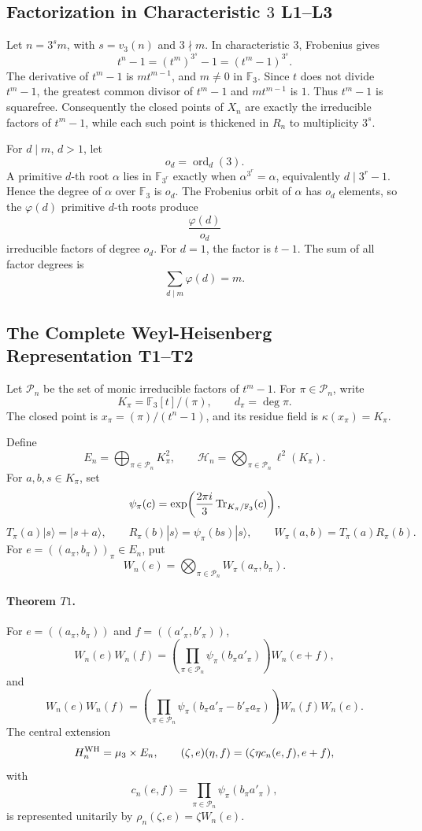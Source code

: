 \subsection{Factorization in Characteristic \texorpdfstring{\(3\)}{3} L1--L3}

Let \(n=3^s m\), with \(s=v_3(n)\) and \(3\nmid m\).  In characteristic
\(3\), Frobenius gives
\[
  t^n-1=(t^m)^{3^s}-1=(t^m-1)^{3^s}.
\]
The derivative of \(t^m-1\) is \(m t^{m-1}\), and \(m\ne0\) in
\(\mathbb F_3\).  Since \(t\) does not divide \(t^m-1\), the greatest common
divisor of \(t^m-1\) and \(m t^{m-1}\) is \(1\).  Thus \(t^m-1\) is
squarefree.  Consequently the closed points of \(X_n\) are exactly the
irreducible factors of \(t^m-1\), while each such point is thickened in
\(R_n\) to multiplicity \(3^s\).

For \(d\mid m\), \(d>1\), let
\[
  o_d=\operatorname{ord}_d(3).
\]
A primitive \(d\)-th root \(\alpha\) lies in \(\mathbb F_{3^r}\) exactly when
\(\alpha^{3^r}=\alpha\), equivalently \(d\mid 3^r-1\).  Hence the degree of
\(\alpha\) over \(\mathbb F_3\) is \(o_d\).  The Frobenius orbit of
\(\alpha\) has \(o_d\) elements, so the \(\varphi(d)\) primitive \(d\)-th
roots produce
\[
  \frac{\varphi(d)}{o_d}
\]
irreducible factors of degree \(o_d\).  For \(d=1\), the factor is \(t-1\).
The sum of all factor degrees is
\[
  \sum_{d\mid m}\varphi(d)=m.
\]

\subsection{The Complete Weyl-Heisenberg Representation T1--T2}

Let \(\mathcal P_n\) be the set of monic irreducible factors of \(t^m-1\).
For \(\pi\in\mathcal P_n\), write
\[
  K_\pi=\mathbb F_3[t]/(\pi),\qquad d_\pi=\deg\pi.
\]
The closed point is \(x_\pi=(\pi)/(t^n-1)\), and its residue field is
\(\kappa(x_\pi)=K_\pi\).

Define
\[
  E_n=\bigoplus_{\pi\in\mathcal P_n}K_\pi^2,\qquad
  \mathcal H_n=\bigotimes_{\pi\in\mathcal P_n}\ell^2(K_\pi).
\]
For \(a,b,s\in K_\pi\), set
\[
  \psi_\pi(c)=
  \exp\!\left(\frac{2\pi i}{3}\operatorname{Tr}_{K_\pi/\mathbb F_3}(c)\right),
\]
\[
  T_\pi(a)|s\rangle=|s+a\rangle,\qquad
  R_\pi(b)|s\rangle=\psi_\pi(bs)|s\rangle,\qquad
  W_\pi(a,b)=T_\pi(a)R_\pi(b).
\]
For \(e=((a_\pi,b_\pi))_\pi\in E_n\), put
\[
  W_n(e)=\bigotimes_{\pi\in\mathcal P_n}W_\pi(a_\pi,b_\pi).
\]

\paragraph{Theorem \(T1\).}
For \(e=((a_\pi,b_\pi))\) and \(f=((a'_\pi,b'_\pi))\),
\[
  W_n(e)W_n(f)
  =
  \left(\prod_{\pi\in\mathcal P_n}\psi_\pi(b_\pi a'_\pi)\right)
  W_n(e+f),
\]
and
\[
  W_n(e)W_n(f)
  =
  \left(\prod_{\pi\in\mathcal P_n}
  \psi_\pi(b_\pi a'_\pi-b'_\pi a_\pi)\right)
  W_n(f)W_n(e).
\]
The central extension
\[
  H_n^{\rm WH}=\mu_3\times E_n,\qquad
  (\zeta,e)(\eta,f)=(\zeta\eta c_n(e,f),e+f),
\]
with
\[
  c_n(e,f)=\prod_{\pi\in\mathcal P_n}\psi_\pi(b_\pi a'_\pi),
\]
is represented unitarily by \(\rho_n(\zeta,e)=\zeta W_n(e)\).

